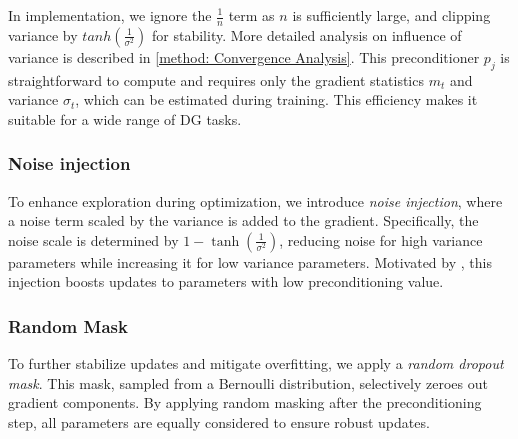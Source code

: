 \documentclass{article}
\theoremstyle{plain}
\theoremstyle{definition}
\theoremstyle{remark}
\begin{document}
In implementation, we ignore the $\frac{1}{n}$ term as $n$ is sufficiently large, and clipping variance by $tanh(\frac{1}{\sigma^2})$ for stability. More detailed analysis on influence of variance is described in \cref{method: Convergence Analysis}. This preconditioner $p_j$ is straightforward to compute and requires only the gradient statistics $m_t$ and variance $\sigma_t$, which can be estimated during training. This efficiency makes it suitable for a wide range of DG tasks.

\subsubsection{Noise injection}
To enhance exploration during optimization, we introduce \textit{noise injection}, where a noise term scaled by the variance is added to the gradient. Specifically, the noise scale is determined by \(1 - \tanh(\frac{1}{\sigma^2})\), reducing noise for high variance parameters while increasing it for low variance parameters. Motivated by \cite{gradsurg}, this injection boosts updates to parameters with low preconditioning value. 

\subsubsection{Random Mask}
To further stabilize updates and mitigate overfitting, we apply a \textit{random dropout mask}. This mask, sampled from a Bernoulli distribution, selectively zeroes out gradient components. By applying random masking after the preconditioning step, all parameters are equally considered to ensure robust updates.
\end{document}
